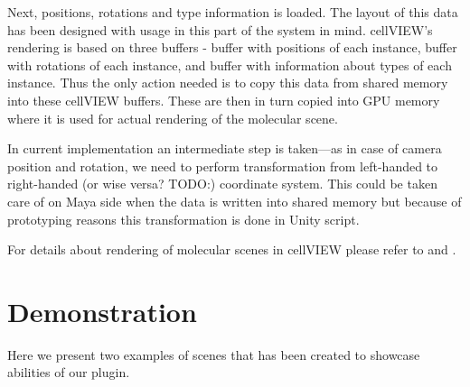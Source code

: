 \documentclass[
  digital, %
  table,   %
  nolof,     %
  nolot,     %
]{fithesis3}
\begin{document}
Next, positions, rotations and type information is loaded. The layout of this data has been designed with usage in this part of the system in mind. cellVIEW's rendering is based on three buffers - buffer with positions of each instance, buffer with rotations of each instance, and buffer with information about types of each instance. Thus the only action needed is to copy this data from shared memory into these cellVIEW buffers. These are then in turn copied into GPU memory where it is used for actual rendering of the molecular scene.

In current implementation an intermediate step is taken—as in case of camera position and rotation, we need to perform transformation from left-handed to right-handed (or wise versa? TODO:) coordinate system. This could be taken care of on Maya side when the data is written into shared memory but because of prototyping reasons this transformation is done in Unity script.

For details about rendering of molecular scenes in cellVIEW please refer to \cite{lemuzic-2014-ivm} and \cite{cellVIEW_2015}.

\chapter{Demonstration}
Here we present two examples of scenes that has been created to showcase abilities of our plugin.
\end{document}
